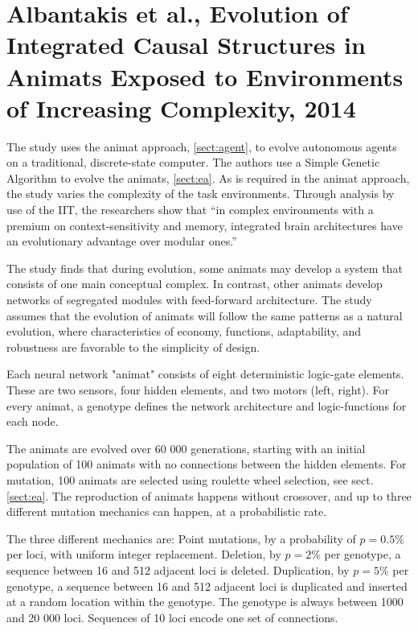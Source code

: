 \section{Albantakis et al., Evolution of Integrated Causal Structures in Animats Exposed to Environments of Increasing Complexity, 2014}
The study uses the animat approach,  \vref{sect:agent}, to evolve autonomous agents on a traditional, discrete-state computer.
The authors use a Simple Genetic Algorithm to evolve the animats, \vref{sect:ea}.
As is required in the animat approach, the study varies the complexity of the task environments.
Through analysis by use of the IIT, the researchers show that ``in complex environments with a premium on context-sensitivity and memory, integrated brain architectures have an evolutionary advantage over modular ones.''\cite{albantakis_evolution_2014-1}

The study finds that during evolution, some animats may develop a system that consists of one main conceptual complex. In contrast, other animats develop networks of segregated modules with feed-forward architecture. The study assumes that the evolution of animats will follow the same patterns as a natural evolution, where characteristics of economy, functions, adaptability, and robustness are favorable to the simplicity of design.

Each neural network "animat" consists of eight deterministic logic-gate elements. These are two sensors, four hidden elements, and two motors (left, right).
For every animat, a genotype defines the network architecture and logic-functions for each node.

The animats are evolved over 60 000 generations, starting with an initial population of 100 animats with no connections between the hidden elements.
For mutation, 100 animats are selected using roulette wheel selection, see sect. \vref{sect:ea}.
The reproduction of animats happens without crossover, and up to three different mutation mechanics can happen, at a probabilistic rate.\cite{albantakis_evolution_2014}

The three different mechanics are: Point mutations, by a probability of $p = 0.5 \%$ per loci, with uniform integer replacement. Deletion, by $p = 2\%$ per genotype, a sequence between 16 and 512 adjacent loci is deleted. Duplication, by $p = 5\%$ per genotype, a sequence between 16 and 512 adjacent loci is duplicated and inserted at a random location within the genotype.
The genotype is always between 1000 and 20 000 loci. Sequences of 10 loci encode one set of connections.\cite{albantakis_evolution_2014}


